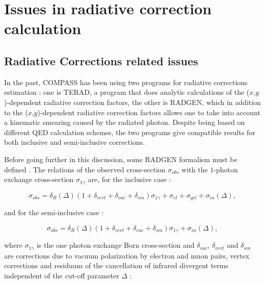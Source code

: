 
\chapter{Issues in radiative correction calculation} %

\label{ch:Issues} %


\section{Radiative Corrections related issues}

In the past, COMPASS has been using two programs for radiative corrections estimation : one is TERAD, a program that does analytic calculations of the ($x$,$y$)-dependent radiative correction factors, the other is RADGEN, which in addition to the ($x$,$y$)-dependent radiative correction factors allows one to take into account a kinematic smearing caused by the radiated photon. Despite being based on different QED calculation schemes, the two programs give compatible results for both inclusive and semi-inclusive corrections.

Before going further in this discussion, some RADGEN formalism must be defined \cite{RADGEN}. The relations of the observed cross-section $\sigma_{obs}$ with the $1$-photon exchange cross-section $\sigma_{1\gamma}$ are, for the inclusive case :

\begin{equation}
    \sigma_{obs} = \delta_R(\Delta) (1+\delta_{vert}+\delta_{vac}+\delta_{sm})\sigma_{1\gamma}+\sigma_{el}+\sigma_{qel}+\sigma_{in}(\Delta),
\end{equation}

and for the semi-inclusive case :

\begin{equation}
    \sigma_{obs} = \delta_R(\Delta) (1+\delta_{vert}+\delta_{vac}+\delta_{sm})\sigma_{1\gamma}+\sigma_{in}(\Delta),
\end{equation}

where $\sigma_{1\gamma}$ is the one photon exchange Born cross-section and $\delta_{vac}$, $\delta_{vert}$ and $\delta_{sm}$ are corrections due to vacuum polarization by electron and muon pairs, vertex corrections and residuum of the cancellation of infrared divergent terms independent of the cut-off parameter $\Delta$ :

